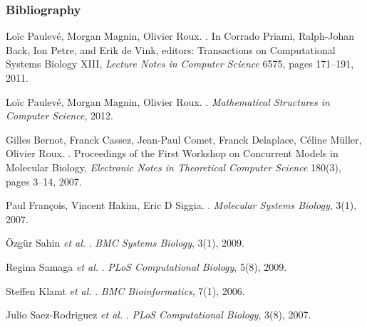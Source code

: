 \begin{frame}[c]
  \frametitle{Bibliography}

\small
\setlength{\parindent}{-1em}
\setlength{\parskip}{0.5em}

\tcitebullet Loïc Paulevé, Morgan Magnin, Olivier Roux.
.
In Corrado Priami, Ralph-Johan Back, Ion Petre, and Erik de Vink, editors: Transactions on Computational Systems Biology XIII,
\textit{Lecture Notes in Computer Science} 6575, pages 171--191, 2011.

\tcitebullet Loïc Paulevé, Morgan Magnin, Olivier Roux.
.
\textit{Mathematical Structures in Computer Science}, 2012.

\tcitebullet Gilles Bernot, Franck Cassez, Jean-Paul Comet, Franck Delaplace, Céline Müller, Olivier Roux.
.
Proceedings of the First Workshop on Concurrent Models in Molecular Biology, \textit{Electronic Notes in Theoretical Computer Science} 180(3), pages 3--14, 2007.

\tcitebullet Paul François, Vincent Hakim, Eric D Siggia.
.
\textit{Molecular Systems Biology}, 3(1), 2007.

\tcitebullet Özgür Sahin \textit{et al.}
.
\textit{BMC Systems Biology}, 3(1), 2009.

\tcitebullet Regina Samaga \textit{et al.}
.
\textit{PLoS Computational Biology}, 5(8), 2009.

\tcitebullet Steffen Klamt \textit{et al.}
.
\textit{BMC Bioinformatics}, 7(1), 2006.

\tcitebullet Julio Saez-Rodriguez \textit{et al.}
.
\textit{PLoS Computational Biology}, 3(8), 2007.

\end{frame}


